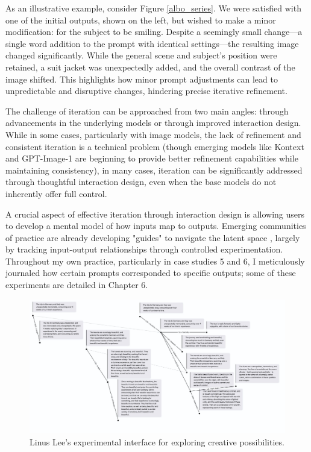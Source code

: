 As an illustrative example, consider Figure \ref{albo_series}. We were satisfied with one of the initial outputs, shown on the left, but wished to make a minor modification: for the subject to be smiling. Despite a seemingly small change—a single word addition to the prompt with identical settings—the resulting image changed significantly. While the general scene and subject's position were retained, a suit jacket was unexpectedly added, and the overall contrast of the image shifted. This highlights how minor prompt adjustments can lead to unpredictable and disruptive changes, hindering precise iterative refinement.

The challenge of iteration can be approached from two main angles: through advancements in the underlying models or through improved interaction design. While in some cases, particularly with image models, the lack of refinement and consistent iteration is a technical problem (though emerging models like Kontext and GPT-Image-1 are beginning to provide better refinement capabilities while maintaining consistency), in many cases, iteration can be significantly addressed through thoughtful interaction design, even when the base models do not inherently offer full control.

A crucial aspect of effective iteration through interaction design is allowing users to develop a mental model of how inputs map to outputs. Emerging communities of practice are already developing "guides" to navigate the latent space \cite{Smith2022-dm}, largely by tracking input-output relationships through controlled experimentation. Throughout my own practice, particularly in case studies 5 and 6, I meticulously journaled how certain prompts corresponded to specific outputs; some of these experiments are detailed in Chapter 6.

\begin{figure}[H]
    \centering
    \includegraphics[width=0.8\linewidth]{linus.png}
    \caption{Linus Lee's experimental interface for exploring creative possibilities.}
    \label{fig:linus}
\end{figure}

